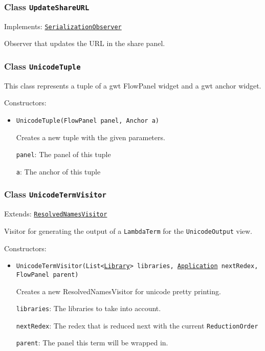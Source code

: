 \subsubsection{Class \texttt{UpdateShareURL}}
\label{type:edu.kit.wavelength.client.view.update.UpdateShareURL}
Implements: \texttt{\hyperref[type:edu.kit.wavelength.client.view.SerializationObserver]{SerializationObserver}}

Observer that updates the URL in the share panel.

\subsubsection{Class \texttt{UnicodeTuple}}
\label{type:edu.kit.wavelength.client.view.update.UnicodeTuple}
This class represents a tuple of a gwt FlowPanel widget and a gwt anchor
 widget.

Constructors:
\begin{itemize}
\item \texttt{UnicodeTuple(FlowPanel panel, Anchor a)}

Creates a new tuple with the given parameters.

\texttt{panel}: The panel of this tuple

\texttt{a}: The anchor of this tuple

\end{itemize}

\subsubsection{Class \texttt{UnicodeTermVisitor}}
\label{type:edu.kit.wavelength.client.view.update.UnicodeTermVisitor}
Extends: \texttt{\hyperref[type:edu.kit.wavelength.client.model.term.ResolvedNamesVisitor]{ResolvedNamesVisitor}}

Visitor for generating the output of a \texttt{LambdaTerm} for the
 \texttt{UnicodeOutput} view.

Constructors:
\begin{itemize}
\item \texttt{UnicodeTermVisitor(List<\hyperref[type:edu.kit.wavelength.client.model.library.Library]{Library}> libraries, \hyperref[type:edu.kit.wavelength.client.model.term.Application]{Application} nextRedex, FlowPanel parent)}

Creates a new ResolvedNamesVisitor for unicode pretty printing.

\texttt{libraries}: The libraries to take into account.

\texttt{nextRedex}: The redex that is reduced next with the current
            \texttt{ReductionOrder}

\texttt{parent}: The panel this term will be wrapped in.

\end{itemize}

